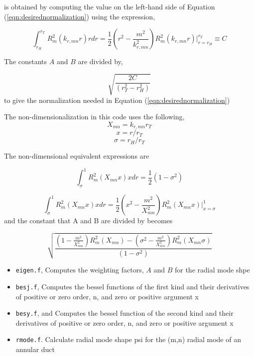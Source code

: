 \documentclass[12pt]{article}
\begin{document}
is obtained by computing the value on the left-hand side of 
Equation (\ref{eqn:desirednormalization}) using the expression,

\begin{equation}
    \int_{r_H}^{r_T} R_m^2(k_{r,mn} r) r dr = 
    \frac{1}{2}\left( r^2 - \frac{m^2}{k_{r,mn}^2} \right)R_m^2 (k_{r,mn} r)\Big|_{r = r_H}^{r_T} \equiv C
\end{equation}

The constants $A$ and $B$ are divided by,

\begin{equation}
    \sqrt{\frac{2C}{\left( r_T^2 - r_H^2 \right)}}
    \label{eqn:normalizationconst}
\end{equation}
to give the normalization needed in Equation (\ref{eqn:desirednormalization}) 

The non-dimensionalization in this code uses the following,
\[ X_{mn} = k_{r,mn} r_T\]
\[ x = r/r_T\]
\[ \sigma = r_H/r_T\]

The non-dimensional equivalent expressions are 

\begin{equation}
    \int_{\sigma}^{1} R_m^2(X_{mn} x) x dr = \frac{1}{2}\left( 1 - \sigma^2 \right)
    \label{eqn:desirednormalization_nondimensional}
\end{equation}

\begin{equation}
    \int_{\sigma}^{1} R_m^2(X_{mn} x) x dr = 
    \frac{1}{2}\left( x^2 - \frac{m^2}{X_{mn}^2} \right)R_m^2 (X_{mn} x)\Big|_{x = \sigma}^{1}
\end{equation}
and the constant that A and B are divided by becomes 

\begin{equation}
    \sqrt{\frac{
\left( 1 - \frac{m^2}{X_{mn}^2} \right)R_m^2 (X_{mn} )  -
\left( \sigma^2 - \frac{m^2}{X_{mn}^2} \right)R_m^2 (X_{mn} \sigma)
}{\left( 1 - \sigma^2 \right)}}
    \label{eqn:normalizationconst_nondimension}
\end{equation}
\begin{itemize}
    \item \verb|eigen.f|, 
        \subitem Computes the weighting factors, $A$ and $B$ for the radial mode
        shpe
    \item \verb|besj.f|, 
        \subitem Computes the bessel functions of the first kind and their derivatives
        of positive or zero order, n, and zero or positive argument x 
    \item \verb|besy.f|, and 
        \subitem Computes the bessel function of the second kind and their 
        derivatives of positive or zero order, n, and zero or positive argument x 
    \item \verb|rmode.f|. 
        \subitem Calculate radial mode shape psi for the (m,n) radial mode of an annular duct 
\end{itemize}
\end{document}
